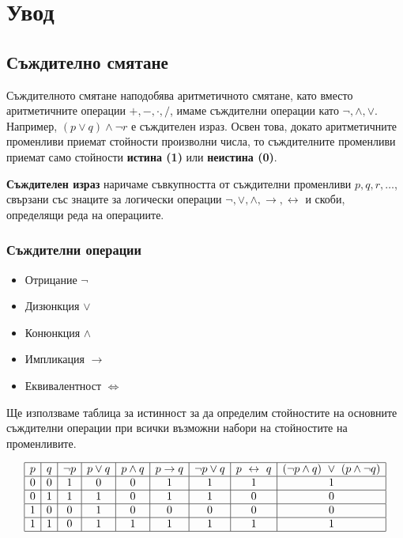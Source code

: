 \chapter{Увод}

\section{Съждително смятане}
\label{sect:propositional}

Съждителното смятане наподобява аритметичното смятане, като вместо аритметичните операции $+,-,\cdot,/$, 
имаме съждителни операции като $\neg, \wedge, \vee$.
Например, $(p\vee q) \wedge \neg  r$ е съждителен израз.
Освен това, докато аритметичните променливи приемат стойности произволни числа, то
съждителните променливи приемат само стойности {\bf истина (1)} или {\bf неистина (0)}.

{\bf Съждителен израз} наричаме съвкупността от съждителни променливи $p,q,r,\dots$, свързани със знаците за логически операции
$\neg, \vee, \wedge, \rightarrow, \leftrightarrow$ и скоби, определящи реда на операциите.

\subsection*{Съждителни операции}

\begin{itemize}
\item
  Отрицание $\neg$
\item 
  Дизюнкция $\vee$
\item
  Конюнкция $\wedge$
\item
  Импликация $\rightarrow$
\item
  Еквивалентност $\iff$
\end{itemize}

Ще използваме таблица за истинност за да определим стойностите на основните съждителни операции
при всички възможни набори на стойностите на променливите.

\[
\begin{array}{|c|c|c|c|c|c|c|c|c|}
  \hline
  p & q & \neg p & p \vee q & p \wedge q & p \rightarrow q & \neg p \vee q & p \iff q & (\neg{p}\wedge q)\ \vee\ (p\wedge \neg q) \\
  \hline
  0 & 0 & 1 & 0 & 0 & 1 & 1 & 1 & 1\\
  \hline
  0 & 1 & 1 & 1 & 0 & 1 & 1 & 0 & 0\\
  \hline
  1 & 0 & 0 & 1 & 0 & 0 & 0 & 0 & 0\\
  \hline
  1 & 1 & 0 & 1 & 1 & 1 & 1 & 1 & 1\\
  \hline
\end{array}
\]


